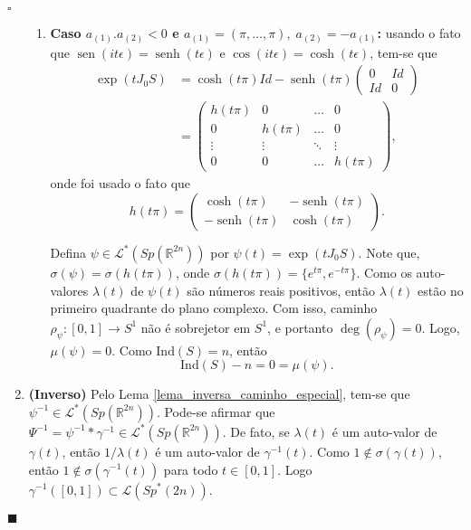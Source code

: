\documentclass[12pt]{book}
\newenvironment{prova}[1]{$\square$ #1}{\hfill$\blacksquare$}
\DeclareMathOperator{\sen}{sen}
\DeclareMathOperator{\senh}{senh}
\newcommand{\caminhosespeciais}[1]{\mathcal{L}^{*}(#1)}
\newcommand{\caminhos}{\mathcal{L}}
\newcommand{\circulo}{S^{1}}
\newcommand{\espectrooperador}[1]{\sigma(#1)}
\newcommand{\estruturacomplexa}{J_{0}}
\newcommand{\gruposimpletico}[1]{Sp(#1)}
\newcommand{\gruposimpleticonaodegenerado}[1]{Sp^{#1}(2n)}
\newcommand{\ind}{\text{Ind}}
\newcommand{\intervalo}{[0,1]}
\newcommand{\real}[1]{\mathbb{R}^{#1}}
\begin{document}
\begin{prova}
\begin{enumerate}
\begin{enumerate}
				\item \textbf{Caso $a_{(1)}.a_{(2)}<0$ e $a_{(1)}=(\pi,\dots,\pi), \; a_{(2)} = -a_{(1)}$:} usando o fato que $\sen(it\epsilon)=\senh(t\epsilon)$ e $\cos(it\epsilon)=\cosh(t\epsilon)$, tem-se que
				$$
				\begin{aligned}
				\exp(t\estruturacomplexa S) 
				&= \cosh(t\pi)Id- \senh(t\pi)\left(
				\begin{array}{cc}
				0 & Id
				\\
				Id & 0  
				\end{array}
				\right)
				\\
				&=	
				\left(
				\begin{array}{ccccc}
				h(t\pi) & 0 &\dots & 0 
				\\
				0 & h(t\pi) &\dots & 0 
				\\
				\vdots & \vdots & \ddots & \vdots 
				\\
				0 & 0 & \dots & h(t\pi)
				\end{array}
				\right),
				\end{aligned}
				$$
				onde foi usado o fato que 
				$$
				h(t\pi) = 
				\left(
				\begin{array}{cc}
				\cosh(t\pi) & -\senh(t\pi)
				\\
				-\senh(t\pi) & \cosh(t\pi)
				\end{array}
				\right).
				$$
				
				Defina $\psi \in \caminhosespeciais{\gruposimpletico{\real{2n}}}$ por $\psi(t) = \exp(t\estruturacomplexa S)$. Note que, $\espectrooperador{\psi}= \espectrooperador{h(t\pi)} $, onde $\espectrooperador{h(t\pi)} = \{e^{t\pi} , e^{-t\pi}\}$. Como os auto-valores $\lambda(t)$ de $\psi(t)$ são números reais positivos, então $\lambda(t)$ estão no primeiro quadrante do plano complexo. Com isso, caminho $\rho_{\psi}:\intervalo\to \circulo$ não é sobrejetor em $\circulo$, e portanto $\deg(\rho_{\psi}) = 0$. Logo, $\mu(\psi) = 0$. Como $\ind(S) = n$, então
				$$
				\ind(S) - n = 0 =\mu(\psi).
				$$
				
			\end{enumerate}
			
			\item \textbf{(Inverso)} Pelo Lema \ref{lema_inversa_caminho_especial}, tem-se que $\psi^{-1} \in \caminhosespeciais{\gruposimpletico{\real{2n}}}$. Pode-se afirmar que $\Psi^{-1}= \psi^{-1}*\gamma^{-1} \in \caminhosespeciais{\gruposimpletico{\real{2n}}}$. De fato, se $\lambda(t)$ é um auto-valor de $\gamma(t)$, então $1/\lambda(t)$ é um auto-valor de $\gamma^{-1}(t)$. Como $1 \notin\espectrooperador{\gamma(t)}$, então $1 \notin\espectrooperador{\gamma^{-1}(t)}$
			para todo $t\in \intervalo$. Logo $\gamma^{-1}(\intervalo)\subset\caminhos(\gruposimpleticonaodegenerado{*})$. 
			

\end{enumerate}
\end{prova}
\end{document}
